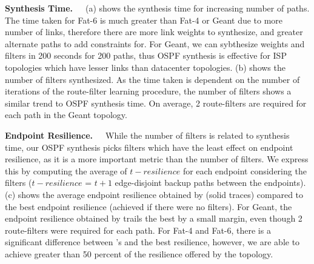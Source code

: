 \noindent\textbf{Synthesis Time.}~~~(a) 
shows the synthesis time for increasing number of paths. 
The time taken for Fat-6 is much greater than Fat-4 or Geant
due to more number of links, therefore there are more link weights
to synthesize, and greater alternate paths to add constraints for. 
For Geant, we can sybthesize weights and filters in 200 seconds 
for 200 paths, thus OSPF synthesis is effective for ISP topologies
which have lesser links than datacenter topologies. 
(b) shows the number of filters synthesized. 
As the time taken is dependent on the number of iterations of
the route-filter learning procedure, the number of filters
shows a similar trend to OSPF synthesis time. On average, 2 route-filters
are required for each path in the Geant topology. 

\noindent\textbf{Endpoint Resilience.}~~~While the number of 
filters is related to synthesis time, our OSPF synthesis picks
filters which have the least effect on endpoint resilience, as it  
is a more important metric than the number of filters. We express this
by computing the average of $t-resilience$ for each endpoint considering
the filters ($t-resilience$ = $t+1$ edge-disjoint backup paths between the 
endpoints).
(c) shows the average
endpoint resilience obtained by \name (solid traces) 
compared to the best endpoint resilience (achieved
if there were no filters). For Geant, the endpoint 
resilience obtained by \name trails the best by a small margin,
even though 2 route-filters were required for each path. For
Fat-4 and Fat-6, there is a significant difference between \name's 
and the best resilience, however, we are able to achieve greater than
50 percent of the resilience offered by the topology. 